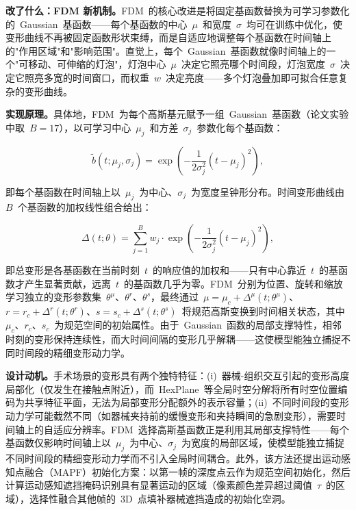 \textbf{改了什么：FDM 新机制。}FDM~的核心改进是将固定基函数替换为可学习参数化的~Gaussian~基函数——每个基函数的中心~$\mu$~和宽度~$\sigma$~均可在训练中优化，使变形曲线不再被固定函数形状束缚，而是自适应地调整每个基函数在时间轴上的"作用区域"和"影响范围"。直觉上，每个~Gaussian~基函数就像时间轴上的一个"可移动、可伸缩的灯泡"，灯泡中心~$\mu$~决定它照亮哪个时间段，灯泡宽度~$\sigma$~决定它照亮多宽的时间窗口，而权重~$w$~决定亮度——多个灯泡叠加即可拟合任意复杂的变形曲线。

\textbf{实现原理。}具体地，FDM~为每个高斯基元赋予一组~Gaussian~基函数（论文实验中取~$B=17$），以可学习中心~$\mu_j$~和方差~$\sigma_j$~参数化每个基函数：

\begin{equation}
    \tilde{b}(t;\mu_j,\sigma_j) = \exp\left(-\frac{1}{2\sigma_j^2}(t-\mu_j)^2\right),
\end{equation}

即每个基函数在时间轴上以~$\mu_j$~为中心、$\sigma_j$~为宽度呈钟形分布。时间变形曲线由~$B$~个基函数的加权线性组合给出：

\begin{equation}
    \Delta(t;\theta) = \sum_{j=1}^{B} w_j \cdot \exp\left(-\frac{1}{2\sigma_j^2}(t-\mu_j)^2\right),
\end{equation}

即总变形是各基函数在当前时刻~$t$~的响应值的加权和——只有中心靠近~$t$~的基函数才产生显著贡献，远离~$t$~的基函数几乎为零。FDM~分别为位置、旋转和缩放学习独立的变形参数集~$\theta^\mu$、$\theta^r$、$\theta^s$，最终通过~$\mu = \mu_c + \Delta^\mu(t;\theta^\mu)$、$r = r_c + \Delta^r(t;\theta^r)$、$s = s_c + \Delta^s(t;\theta^s)$~将规范高斯变换到时间相关状态，其中~$\mu_c$、$r_c$、$s_c$~为规范空间的初始属性。由于~Gaussian~函数的局部支撑特性，相邻时刻的变形保持连续性，而大时间间隔的变形几乎解耦——这使模型能独立捕捉不同时间段的精细变形动力学。

\textbf{设计动机。}手术场景的变形具有两个独特特征：(i)~器械-组织交互引起的变形高度局部化（仅发生在接触点附近），而~HexPlane~等全局时空分解将所有时空位置编码为共享特征平面，无法为局部变形分配额外的表示容量；(ii)~不同时间段的变形动力学可能截然不同（如器械夹持前的缓慢变形和夹持瞬间的急剧变形），需要时间轴上的自适应分辨率。FDM~选择高斯基函数正是利用其局部支撑特性——每个基函数仅影响时间轴上以~$\mu_j$~为中心、$\sigma_j$~为宽度的局部区域，使模型能独立捕捉不同时间段的精细变形动力学而不引入全局时间耦合。此外，该方法还提出运动感知点融合（MAPF）初始化方案：以第一帧的深度点云作为规范空间初始化，然后计算运动感知遮挡掩码识别具有显著运动的区域（像素颜色差异超过阈值~$\tau$~的区域），选择性融合其他帧的~3D~点填补器械遮挡造成的初始化空洞。

